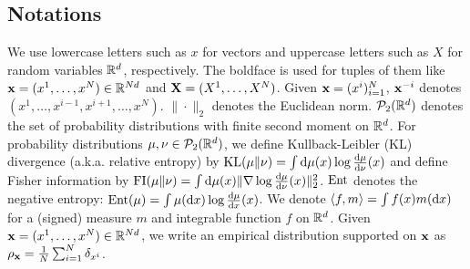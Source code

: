 \subsection{Notations}
We use lowercase letters such as $x$ for vectors and uppercase letters such as $X$ for random variables $\mathbb{R}^d$, respectively. The boldface is used for tuples of them like $\mathbf{x} = (x^1,\ldots,x^N) \in \mathbb{R}^{Nd}$ and $\mathbf{X}=(X^1,\ldots,X^N)$. Given $\mathbf{x}=(x^i)_{i=1}^N$, $\mathbf{x}^{-i}$ denotes $(x^1,\ldots,x^{i-1},x^{i+1},\ldots,x^N)$. 
$\|\cdot\|_2$ denotes the Euclidean norm. $\mathcal{P}_2(\mathbb{R}^d)$ denotes the set of probability distributions with finite second moment on $\mathbb{R}^d$.
For probability distributions $\mu, \nu \in \mathcal{P}_2(\mathbb{R}^d)$, we define 
Kullback-Leibler (KL) divergence (a.k.a. relative entropy) by $\mathrm{KL}(\mu\|\nu) = \int \mathrm{d}\mu(x) \log \frac{\mathrm{d} \mu}{\mathrm{d} \nu}(x)$ and define Fisher information by $\mathrm{FI}(\mu\|\nu) = \int \mathrm{d}\mu(x) \|\nabla \log \frac{\mathrm{d} \mu}{ \mathrm{d} \nu}(x)\|_2^2$. 
$\mathrm{Ent}$ denotes the negative entropy: $\mathrm{Ent}(\mu) = \int  \mu(\mathrm{d} x)\log \frac{\mathrm{d} \mu}{\mathrm{d} x}(x)$. 
We denote $\pd< f, m>= \int f(x) m(\rd x)$ for a (signed) measure $m$ and integrable function $f$ on $\mathbb{R}^d$. 
Given $\mathbf{x}=(x^1,\ldots,x^N) \in \mathbb{R}^{Nd}$, we write an empirical distribution supported on $\mathbf{x}$ as $\rho_{\mathbf{x}} = \frac{1}{N}\sum_{i=1}^N \delta_{x^i}$.

